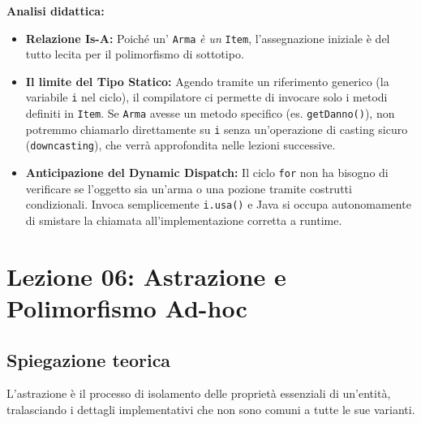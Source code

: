 \documentclass[12pt, a4paper]{article}
\begin{document}
\textbf{Analisi didattica:}
\begin{itemize}
    \item \textbf{Relazione Is-A:} Poiché un' \texttt{Arma} \textit{è un} \texttt{Item}, l'assegnazione iniziale è del tutto lecita per il polimorfismo di sottotipo. 
    \item \textbf{Il limite del Tipo Statico:} Agendo tramite un riferimento generico (la variabile \texttt{i} nel ciclo), il compilatore ci permette di invocare solo i metodi definiti in \texttt{Item}. Se \texttt{Arma} avesse un metodo specifico (es. \texttt{getDanno()}), non potremmo chiamarlo direttamente su \texttt{i} senza un'operazione di casting sicuro (\texttt{downcasting}), che verrà approfondita nelle lezioni successive.
    \item \textbf{Anticipazione del Dynamic Dispatch:} Il ciclo \texttt{for} non ha bisogno di verificare se l'oggetto sia un'arma o una pozione tramite costrutti condizionali. Invoca semplicemente \texttt{i.usa()} e Java si occupa autonomamente di smistare la chiamata all'implementazione corretta a runtime.
\end{itemize}

\newpage

\section{Lezione 06: Astrazione e Polimorfismo Ad-hoc}

\subsection{Spiegazione teorica}
L'astrazione è il processo di isolamento delle proprietà essenziali di un'entità, tralasciando i dettagli implementativi che non sono comuni a tutte le sue varianti.
\end{document}
